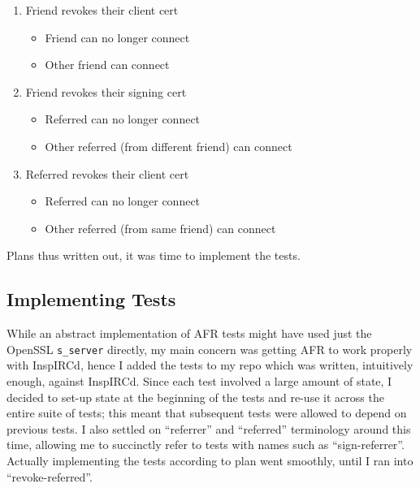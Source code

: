\documentclass{article}
\begin{document}
\begin{enumerate}
	\item Friend revokes their client cert
	\begin{itemize}
		\item Friend can no longer connect
		\item Other friend can connect
	\end{itemize}
	\item Friend revokes their signing cert
	\begin{itemize}
		\item Referred can no longer connect
		\item Other referred (from different friend) can connect
	\end{itemize}
	\item Referred revokes their client cert
	\begin{itemize}
		\item Referred can no longer connect
		\item Other referred (from same friend) can connect
	\end{itemize}
\end{enumerate}
Plans thus written out, it was time to implement the tests.

\subsection{Implementing Tests}
While an abstract implementation of AFR tests might have used just the OpenSSL \texttt{s_server} directly, my main concern was getting AFR to work properly with InspIRCd, hence I added the tests to my  repo which was written, intuitively enough, against InspIRCd.  Since each test involved a large amount of state, I decided to set-up state at the beginning of the tests and re-use it across the entire suite of tests; this meant that subsequent tests were allowed to depend on previous tests.  I also settled on ``referrer'' and ``referred'' terminology around this time, allowing me to succinctly refer to tests with names such as ``sign-referrer''.  Actually implementing the tests according to plan went smoothly, until I ran into ``revoke-referred''.
\end{document}
